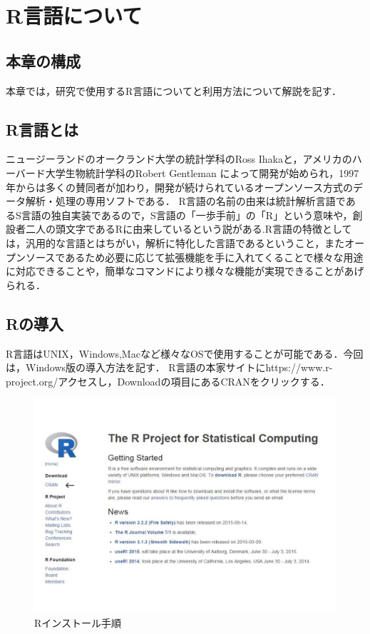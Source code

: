\chapter{R言語について}
\section{本章の構成}
本章では，研究で使用するR言語についてと利用方法について解説を記す．

\section{R言語とは}
ニュージーランドのオークランド大学の統計学科のRoss Ihakaと，アメリカのハーバード大学生物統計学科のRobert Gentleman によって開発が始められ，1997年からは多くの賛同者が加わり，開発が続けられているオープンソース方式のデータ解析・処理の専用ソフトである．\cite{rniyoru}
R言語の名前の由来は統計解析言語であるS言語の独自実装であるので，S言語の「一歩手前」の「R」という意味や，創設者二人の頭文字であるRに由来しているという説がある.\cite{toukei}R言語の特徴としては，汎用的な言語とはちがい，解析に特化した言語であるということ，またオープンソースであるため必要に応じて拡張機能を手に入れてくることで様々な用途に対応できることや，簡単なコマンドにより様々な機能が実現できることがあげられる．

\section{Rの導入}
R言語はUNIX，Windows,Macなど様々なOSで使用することが可能である．今回は，Windows版の導入方法を記す．
R言語の本家サイトにhttps://www.r-project.org/アクセスし，Downloadの項目にあるCRANをクリックする．
\begin{figure}[H]
\centering
\includegraphics[width=13cm]{figure1.pdf}
\caption{Rインストール手順}\label{サンプル図}
\end{figure} 

